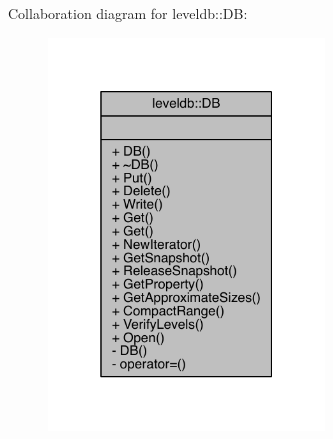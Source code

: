 Collaboration diagram for leveldb\+:\+:D\+B\+:\nopagebreak
\begin{figure}[H]
\begin{center}
\leavevmode
\includegraphics[width=208pt]{classleveldb_1_1_d_b__coll__graph}
\end{center}
\end{figure}
